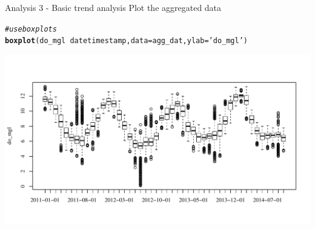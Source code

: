 \documentclass[xcolor=svgnames]{beamer}\usepackage[]{graphicx}\usepackage[]{color}
\makeatletter
\newcommand{\hlstr}[1]{\textcolor[rgb]{0.192,0.494,0.8}{#1}}%
\newcommand{\hlcom}[1]{\textcolor[rgb]{0.678,0.584,0.686}{\textit{#1}}}%
\newcommand{\hlopt}[1]{\textcolor[rgb]{0,0,0}{#1}}%
\newcommand{\hlstd}[1]{\textcolor[rgb]{0.345,0.345,0.345}{#1}}%
\newcommand{\hlkwc}[1]{\textcolor[rgb]{0.333,0.667,0.333}{#1}}%
\newcommand{\hlkwd}[1]{\textcolor[rgb]{0.737,0.353,0.396}{\textbf{#1}}}%
\newenvironment{kframe}{%
 \def\at@end@of@kframe{}%
 \ifinner\ifhmode%
  \def\at@end@of@kframe{\end{minipage}}%
  \begin{minipage}{\columnwidth}%
 \fi\fi%
 \def\FrameCommand##1{\hskip\@totalleftmargin \hskip-\fboxsep
 \colorbox{shadecolor}{##1}\hskip-\fboxsep
     \hskip-\linewidth \hskip-\@totalleftmargin \hskip\columnwidth}%
 \MakeFramed {\advance\hsize-\width
   \@totalleftmargin\z@ \linewidth\hsize
   \@setminipage}}%
 {\par\unskip\endMakeFramed%
 \at@end@of@kframe}
\newenvironment{knitrout}{}{} %
\makeatother
\begin{document}
\begin{frame}[containsverbatim]{Analysis 3 - Basic trend analysis}
Plot the aggregated data
\begin{knitrout}\scriptsize
{}\color{fgcolor}\begin{kframe}
\begin{alltt}
\hlcom{# use boxplots }
\hlkwd{boxplot}\hlstd{(do_mgl} \hlopt{~} \hlstd{datetimestamp,} \hlkwc{data} \hlstd{= agg_dat,} \hlkwc{ylab} \hlstd{=} \hlstr{'do_mgl'}\hlstd{)}
\end{alltt}
\end{kframe}

{\centering \includegraphics[width=\textwidth]{figure/unnamed-chunk-18} 

}



\end{knitrout}
\end{frame}
\end{document}
